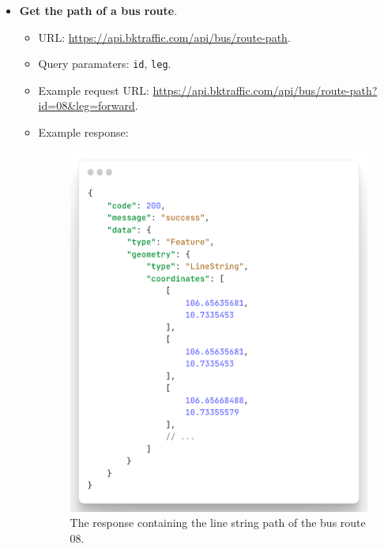 \begin{itemize}
    \item \textbf{Get the path of a bus route}.
    \begin{itemize}
        \item URL: \url{https://api.bktraffic.com/api/bus/route-path}.
        \item Query paramaters: \lstinline{id}, \lstinline{leg}.
        \item Example request URL: \url{https://api.bktraffic.com/api/bus/route-path?id=08&leg=forward}.
        \item Example response:
        \begin{figure}[H]
            \includegraphics[width=\textwidth]{assets/images/Implementation/route_path_response.png}
            \caption{The response containing the line string path of the bus route 08.}
            \label{fig:route_path_response}
        \end{figure}
    \end{itemize} 
\end{itemize}

